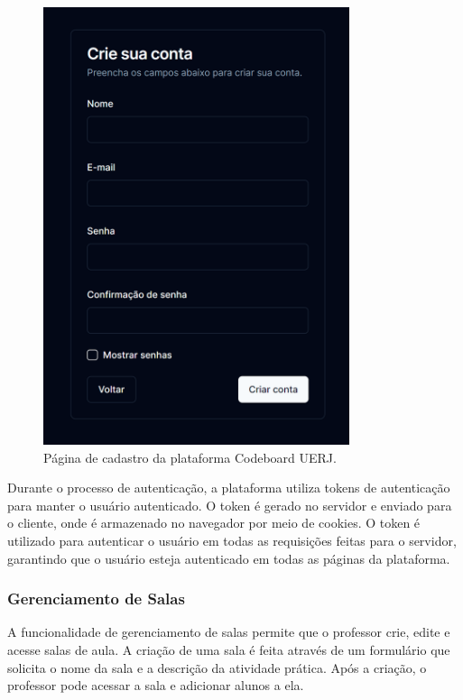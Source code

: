 \begin{figure}[H]
    \centering
    \includegraphics[width=0.8\textwidth]{assets/codeboard/signup-page.png}
    \caption{Página de cadastro da plataforma Codeboard UERJ.}
    \label{fig:signup-page}
\end{figure}

Durante o processo de autenticação, a plataforma utiliza tokens de autenticação para manter o usuário autenticado. O token é gerado no servidor e enviado para o cliente, onde é armazenado no navegador por meio de cookies. O token é utilizado para autenticar o usuário em todas as requisições feitas para o servidor, garantindo que o usuário esteja autenticado em todas as páginas da plataforma.

\subsubsection{Gerenciamento de Salas}

A funcionalidade de gerenciamento de salas permite que o professor crie, edite e acesse salas de aula. A criação de uma sala é feita através de um formulário que solicita o nome da sala e a descrição da atividade prática. Após a criação, o professor pode acessar a sala e adicionar alunos a ela.

